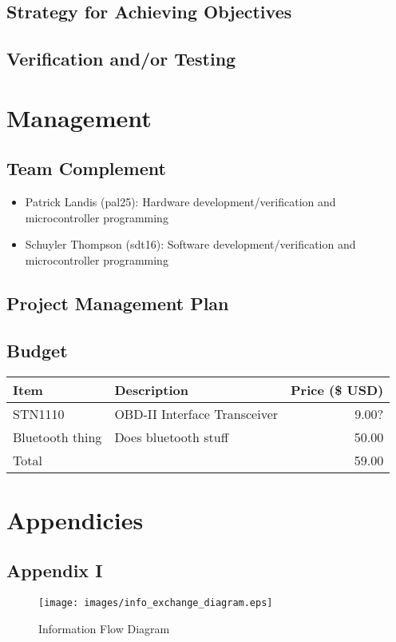\documentclass[12pt,letterpaper]{article}
\begin{document}
\subsection{Strategy for Achieving Objectives}

\subsection{Verification and/or Testing}

\section{Management}
\subsection{Team Complement}
\begin{itemize}
	\item Patrick Landis (pal25): Hardware development/verification and microcontroller programming

	\item Schuyler Thompson (sdt16): Software development/verification and microcontroller programming
\end{itemize}

\subsection{Project Management Plan}



\subsection{Budget}
\begin{tabular}{| l | p{10cm} | r |}
\hline
Item & Description & Price (\$ USD) \\ \hline
STN1110 & OBD-II Interface Transceiver & 9.00? \\ \hline
Bluetooth thing & Does bluetooth stuff & 50.00 \\ \hline
\hline
Total && 59.00 \\ \hline
\end{tabular}

\newpage

\section{Appendicies}
\subsection{Appendix I}
\begin{figure}[!ht]
\centering
\texttt{[image: images/info\_exchange\_diagram.eps]}
\caption{Information Flow Diagram}
\label{fig: image}
\end{figure}
\end{document}
